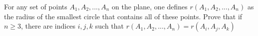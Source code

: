 For any set of points $A_1, A_2,...,A_n$ on the plane, one defines $r( A_1, A_2,...,A_n)$ as the radius of the smallest circle that contains all of these points. Prove that if $n \ge 3$,  there are indices $i,j,k$ such that $r( A_1, A_2,...,A_n)=r( A_i, A_j,A_k)$